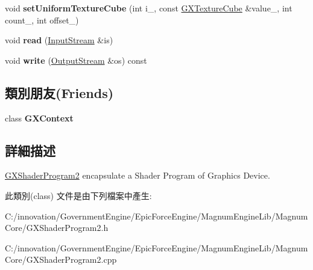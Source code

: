 \begin{DoxyCompactItemize}
\item 
void {\bfseries set\+Uniform\+Texture\+Cube} (int i\+\_\+, const \hyperlink{class_i_dream_sky_1_1_g_x_texture_cube}{G\+X\+Texture\+Cube} \&value\+\_\+, int count\+\_, int offset\+\_)\hypertarget{class_i_dream_sky_1_1_g_x_shader_program2_a9d825f35e27f74469778e4576942f029}{}\label{class_i_dream_sky_1_1_g_x_shader_program2_a9d825f35e27f74469778e4576942f029}

\item 
void {\bfseries read} (\hyperlink{class_i_dream_sky_1_1_input_stream}{Input\+Stream} \&is)\hypertarget{class_i_dream_sky_1_1_g_x_shader_program2_aec1ae6026468cbfc6a7c0215f0f2a336}{}\label{class_i_dream_sky_1_1_g_x_shader_program2_aec1ae6026468cbfc6a7c0215f0f2a336}

\item 
void {\bfseries write} (\hyperlink{class_i_dream_sky_1_1_output_stream}{Output\+Stream} \&os) const \hypertarget{class_i_dream_sky_1_1_g_x_shader_program2_a212b7c960a7688a77be12b9766d31e56}{}\label{class_i_dream_sky_1_1_g_x_shader_program2_a212b7c960a7688a77be12b9766d31e56}

\end{DoxyCompactItemize}
\subsection*{類別朋友(Friends)}
\begin{DoxyCompactItemize}
\item 
class {\bfseries G\+X\+Context}\hypertarget{class_i_dream_sky_1_1_g_x_shader_program2_a2c36d7f8865080802bbad88cd73d871c}{}\label{class_i_dream_sky_1_1_g_x_shader_program2_a2c36d7f8865080802bbad88cd73d871c}

\end{DoxyCompactItemize}


\subsection{詳細描述}
\hyperlink{class_i_dream_sky_1_1_g_x_shader_program2}{G\+X\+Shader\+Program2} encapsulate a Shader Program of Graphics Device. 

此類別(class) 文件是由下列檔案中產生\+:\begin{DoxyCompactItemize}
\item 
C\+:/innovation/\+Government\+Engine/\+Epic\+Force\+Engine/\+Magnum\+Engine\+Lib/\+Magnum\+Core/G\+X\+Shader\+Program2.\+h\item 
C\+:/innovation/\+Government\+Engine/\+Epic\+Force\+Engine/\+Magnum\+Engine\+Lib/\+Magnum\+Core/G\+X\+Shader\+Program2.\+cpp\end{DoxyCompactItemize}

